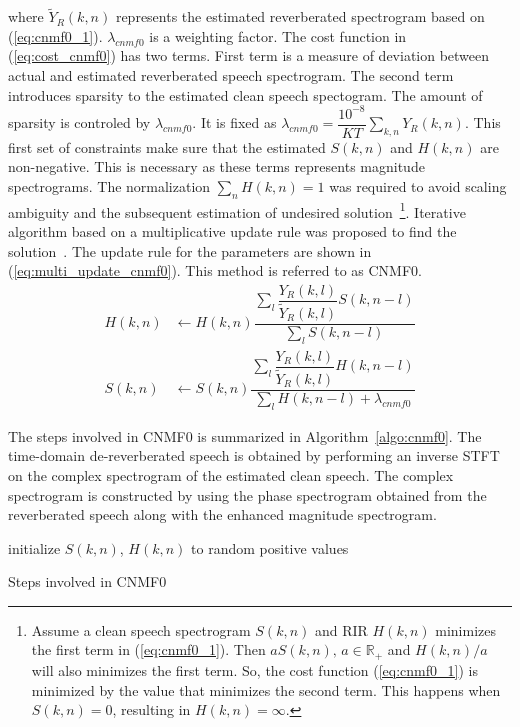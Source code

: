 where $\tilde{Y}_R(k,n)$ represents the estimated reverberated spectrogram based on (\ref{eq:cnmf0_1}). $\lambda_{cnmf0}$ is a weighting factor. The cost function in (\ref{eq:cost_cnmf0}) has two terms. First term is a measure of deviation between actual and estimated reverberated speech spectrogram. The second term introduces sparsity to the estimated clean speech spectogram. The amount of sparsity is controled by $\lambda_{cnmf0}$. It is fixed as $\lambda_{cnmf0}=\dfrac{10^{-8}}{KT}\sum\limits_{k,n}Y_R(k,n)$. This first set of constraints make sure that the estimated $S(k,n)$ and $H(k,n)$ are non-negative. This is necessary as these terms represents magnitude spectrograms. The normalization $\sum\limits_{n}H(k,n) = 1$ was required to avoid scaling ambiguity and the subsequent estimation of undesired solution~\footnote{Assume a clean speech spectrogram $S(k,n)$ and RIR $H(k,n)$ minimizes the first term in (\ref{eq:cnmf0_1}). Then $aS(k,n)\text{, }a\in \mathbb{R}_+$ and $H(k,n)/a$ will also minimizes the first term. So, the cost function (\ref{eq:cnmf0_1}) is minimized by the value that minimizes the second term. This happens when $S(k,n)=0$, resulting in $H(k,n)=\infty$.}. Iterative algorithm based on a multiplicative update rule was proposed to find the solution~\cite{Kumar2011}. The update rule for the parameters are shown in (\ref{eq:multi_update_cnmf0}). This method is referred to as CNMF0.
\begin{align}
H(k,n) & \leftarrow H(k,n) \dfrac{\sum\limits_l\dfrac{Y_R(k,l)}{\tilde{Y}_R(k,l)}S(k,n-l)}{\sum\limits_l S(k,n-l) } \nonumber \\
S(k,n) & \leftarrow S(k,n)\dfrac{\sum\limits_l\dfrac{Y_R(k,l)}{\tilde{Y}_R(k,l)}H(k,n-l)}{\sum\limits_l H(k,n-l) + \lambda_{cnmf0}} 
\label{eq:multi_update_cnmf0}
\end{align}

The steps involved in CNMF0 is summarized in Algorithm~\ref{algo:cnmf0}. The time-domain de-reverberated speech is obtained by performing an inverse STFT on the complex spectrogram of the estimated clean speech. The complex spectrogram is constructed by using the phase spectrogram obtained from the reverberated speech along with the enhanced magnitude spectrogram.  

\begin{algorithm}[H]
\SetAlgoLined
{}
 initialize $S(k,n)$, $H(k,n)$ to random positive values\;
 \caption{Steps involved in CNMF0}
 \label{algo:cnmf0}
\end{algorithm}
